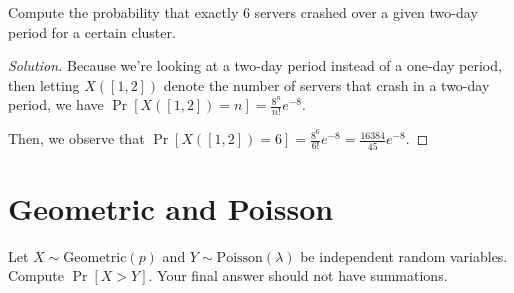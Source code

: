 \documentclass{article}
\newenvironment{solution}{\begin{proof}[Solution]}{\end{proof}}
\begin{document}
\begin{hw}
	Compute the probability that exactly 6 servers crashed over a given two-day period for a certain cluster.
\end{hw}
\begin{solution}
	Because we're looking at a two-day period instead of a one-day period, then letting $X([1,2])$ denote the number of servers that crash in a two-day period, we have $\Pr[X([1,2]) = n] = \frac{8^{n}}{n!} e^{-8}$.
	
	Then, we observe that $\Pr[X([1,2]) = 6] = \frac{8^{6}}{6!} e^{-8} = \frac{16384}{45}e^{-8}$.
\end{solution}

\newpage

\section{Geometric and Poisson}
\begin{hw}
	Let $X \sim \mathrm{Geometric}(p)$ and $Y\sim \mathrm{Poisson}(\lambda)$ be independent random variables. Compute $\Pr[X>Y]$. Your final answer should not have summations.
\end{hw}
\end{document}
